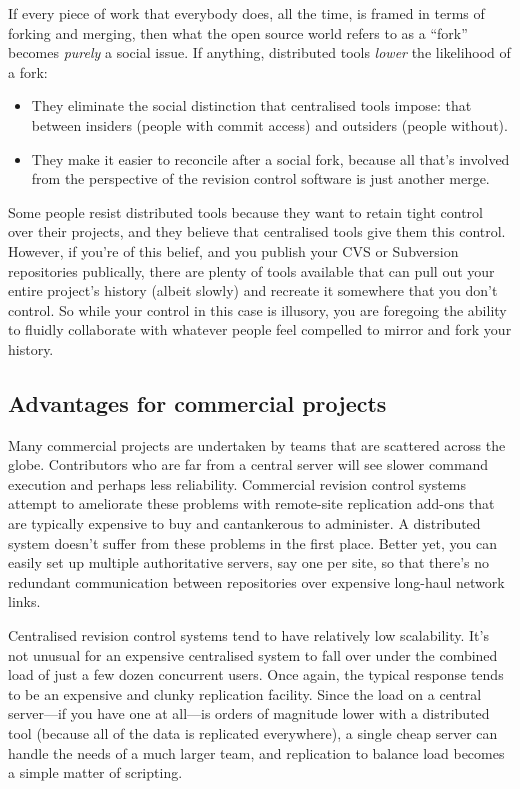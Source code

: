 If every piece of work that everybody does, all the time, is framed in
terms of forking and merging, then what the open source world refers
to as a ``fork'' becomes \emph{purely} a social issue.  If anything,
distributed tools \emph{lower} the likelihood of a fork:
\begin{itemize}
\item They eliminate the social distinction that centralised tools
  impose: that between insiders (people with commit access) and
  outsiders (people without).
\item They make it easier to reconcile after a social fork, because
  all that's involved from the perspective of the revision control
  software is just another merge.
\end{itemize}

Some people resist distributed tools because they want to retain tight
control over their projects, and they believe that centralised tools
give them this control.  However, if you're of this belief, and you
publish your CVS or Subversion repositories publically, there are
plenty of tools available that can pull out your entire project's
history (albeit slowly) and recreate it somewhere that you don't
control.  So while your control in this case is illusory, you are
foregoing the ability to fluidly collaborate with whatever people feel
compelled to mirror and fork your history.

\subsection{Advantages for commercial projects}

Many commercial projects are undertaken by teams that are scattered
across the globe.  Contributors who are far from a central server will
see slower command execution and perhaps less reliability.  Commercial
revision control systems attempt to ameliorate these problems with
remote-site replication add-ons that are typically expensive to buy
and cantankerous to administer.  A distributed system doesn't suffer
from these problems in the first place.  Better yet, you can easily
set up multiple authoritative servers, say one per site, so that
there's no redundant communication between repositories over expensive
long-haul network links.

Centralised revision control systems tend to have relatively low
scalability.  It's not unusual for an expensive centralised system to
fall over under the combined load of just a few dozen concurrent
users.  Once again, the typical response tends to be an expensive and
clunky replication facility.  Since the load on a central server---if
you have one at all---is orders of magnitude lower with a distributed
tool (because all of the data is replicated everywhere), a single
cheap server can handle the needs of a much larger team, and
replication to balance load becomes a simple matter of scripting.

